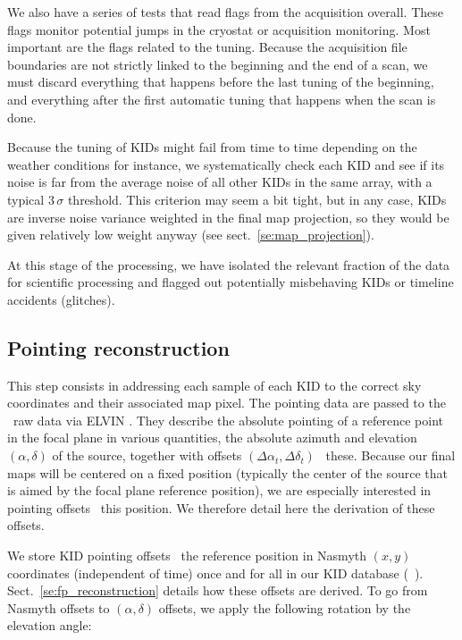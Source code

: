 We also have a series of tests that read flags from the acquisition
overall. These flags monitor potential jumps in the cryostat or acquisition
monitoring. Most important are the flags related to the tuning. Because the
acquisition file boundaries are not strictly linked to the beginning and the end of
a scan, we must discard everything that happens before the last tuning of the
beginning, and everything after the first automatic tuning that happens when the
scan is done.

Because the tuning of KIDs might fail from time to time depending on the weather
conditions for instance, we systematically check each KID and see if its noise
is far from the average noise of all other KIDs in the same array, with a
typical $3\,\sigma$ threshold. This criterion may seem a bit tight, but in any case, KIDs
are inverse noise variance weighted in the final map projection, so they would
be given relatively low weight anyway (see sect.~\ref{se:map_projection}).

At this stage of the processing, we have isolated the relevant fraction of the
data for scientific processing and flagged out potentially misbehaving KIDs or
timeline accidents (glitches).

\subsection{Pointing reconstruction}
\label{se:ptg}

This step consists in addressing each sample of each KID to the correct sky
coordinates and their associated map pixel. The pointing data are passed to the
\nika\ raw data via ELVIN . They describe the absolute
pointing of a reference point in the focal plane in various quantities, the
absolute azimuth and elevation $(\alpha,\delta)$ of the source, together with
offsets $(\Delta\alpha_t, \Delta\delta_t)$ \wrt~these. Because our final maps
will be centered on a fixed position (typically the center of the source that is
aimed by the focal plane reference position), we are especially interested in
pointing offsets \wrt~this position. We therefore detail here the derivation of
these offsets.

We store KID pointing offsets \wrt\ the reference position in Nasmyth $(x,y)$
coordinates (independent of time) once and for all in our KID database
(\aka~\kidpar). Sect.~\ref{se:fp_reconstruction} details how these offsets are
derived. To go from Nasmyth offsets to $(\alpha,\delta)$ offsets, we apply the
following rotation by the elevation angle:

